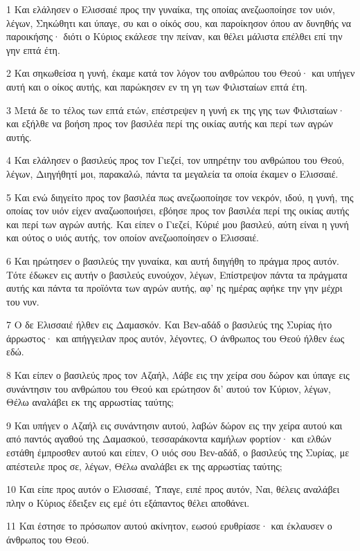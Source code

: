 \par 1 Και ελάλησεν ο Ελισσαιέ προς την γυναίκα, της οποίας ανεζωοποίησε τον υιόν, λέγων, Σηκώθητι και ύπαγε, συ και ο οίκός σου, και παροίκησον όπου αν δυνηθής να παροικήσης· διότι ο Κύριος εκάλεσε την πείναν, και θέλει μάλιστα επέλθει επί την γην επτά έτη.
\par 2 Και σηκωθείσα η γυνή, έκαμε κατά τον λόγον του ανθρώπου του Θεού· και υπήγεν αυτή και ο οίκος αυτής, και παρώκησεν εν τη γη των Φιλισταίων επτά έτη.
\par 3 Μετά δε το τέλος των επτά ετών, επέστρεψεν η γυνή εκ της γης των Φιλισταίων· και εξήλθε να βοήση προς τον βασιλέα περί της οικίας αυτής και περί των αγρών αυτής.
\par 4 Και ελάλησεν ο βασιλεύς προς τον Γιεζεί, τον υπηρέτην του ανθρώπου του Θεού, λέγων, Διηγήθητί μοι, παρακαλώ, πάντα τα μεγαλεία τα οποία έκαμεν ο Ελισσαιέ.
\par 5 Και ενώ διηγείτο προς τον βασιλέα πως ανεζωοποίησε τον νεκρόν, ιδού, η γυνή, της οποίας τον υιόν είχεν αναζωοποιήσει, εβόησε προς τον βασιλέα περί της οικίας αυτής και περί των αγρών αυτής. Και είπεν ο Γιεζεί, Κύριέ μου βασιλεύ, αύτη είναι η γυνή και ούτος ο υιός αυτής, τον οποίον ανεζωοποίησεν ο Ελισσαιέ.
\par 6 Και ηρώτησεν ο βασιλεύς την γυναίκα, και αυτή διηγήθη το πράγμα προς αυτόν. Τότε έδωκεν εις αυτήν ο βασιλεύς ευνούχον, λέγων, Επίστρεψον πάντα τα πράγματα αυτής και πάντα τα προϊόντα των αγρών αυτής, αφ' ης ημέρας αφήκε την γην μέχρι του νυν.
\par 7 Ο δε Ελισσαιέ ήλθεν εις Δαμασκόν. Και Βεν-αδάδ ο βασιλεύς της Συρίας ήτο άρρωστος· και απήγγειλαν προς αυτόν, λέγοντες, Ο άνθρωπος του Θεού ήλθεν έως εδώ.
\par 8 Και είπεν ο βασιλεύς προς τον Αζαήλ, Λάβε εις την χείρα σου δώρον και ύπαγε εις συνάντησιν του ανθρώπου του Θεού και ερώτησον δι' αυτού τον Κύριον, λέγων, Θέλω αναλάβει εκ της αρρωστίας ταύτης;
\par 9 Και υπήγεν ο Αζαήλ εις συνάντησιν αυτού, λαβών δώρον εις την χείρα αυτού και από παντός αγαθού της Δαμασκού, τεσσαράκοντα καμήλων φορτίον· και ελθών εστάθη έμπροσθεν αυτού και είπεν, Ο υιός σου Βεν-αδάδ, ο βασιλεύς της Συρίας, με απέστειλε προς σε, λέγων, Θέλω αναλάβει εκ της αρρωστίας ταύτης;
\par 10 Και είπε προς αυτόν ο Ελισσαιέ, Ύπαγε, ειπέ προς αυτόν, Ναι, θέλεις αναλάβει πλην ο Κύριος έδειξεν εις εμέ ότι εξάπαντος θέλει αποθάνει.
\par 11 Και έστησε το πρόσωπον αυτού ακίνητον, εωσού ερυθρίασε· και έκλαυσεν ο άνθρωπος του Θεού.

